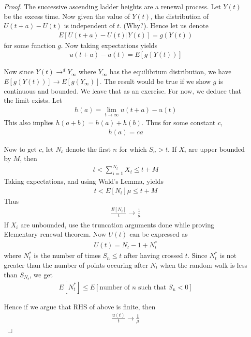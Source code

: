 \documentclass[a4paper,10pt,english]{article}
\begin{document}
\begin{proof}
The successive ascending ladder heights are a renewal process. Let $Y(t)$ be the excess time. Now given the value of $Y(t)$, the distribution of $U(t+a) - U(t)$ is independent of $t$. (Why?). Hence let us denote
\begin{align*}E[U(t+a) - U(t)|Y(t)] = g(Y(t))\end{align*}
for some function $g$. Now taking expectations yields
\begin{align*}u(t+a) - u(t) = E[g(Y(t))]\end{align*}

Now since $Y(t) \to^d Y_\infty$ where $Y_\infty$ has the equilibrium distribution, we have $E[g(Y(t))] \to E[g(Y_\infty)]$. The result would be true if we show $g$ is continuous and bounded. We leave that as an exercise. For now, we deduce that the limit exists. Let
\begin{align*}h(a) = \lim_{t \to \infty}u(t+a) - u(t)\end{align*}
This also implies $h(a+b) = h(a) + h(b)$. Thus for some constant $c$, 
\begin{align*}h(a) = ca\end{align*}

Now to get $c$, let $N_t$ denote the first $n$ for which $S_n > t$. If $X_i$ are upper bounded by $M$, then
\begin{align*}t < \sum_{i=1}^{N_t} X_i \leq t+M\end{align*}
Taking expectations, and using Wald's Lemma, yields
\begin{align*}t < E[N_t]\mu \leq t+M\end{align*}
Thus 
\begin{align*}\frac{E[N_t]}{t} \to \frac{1}{\mu}\end{align*}
If $X_i$ are unbounded, use the truncation arguments done while proving Elementary renewal theorem. Now $U(t)$ can be expressed as
\begin{align*}U(t) = N_t -1 +N_t^*\end{align*}
where $N_t^*$ is the number of times $S_n \leq t$ after having crossed $t$. Since $N_t^*$ is not greater than the number of points occuring after $N_t$ when the random walk is less than $S_{N_t}$, we get
\begin{align*}E[N_t^*] \leq E[\mbox{number of $n$ such that $S_n < 0$}]\end{align*}

Hence if we argue that RHS of above is finite, then
\begin{align*}\frac{u(t)}{t} \to \frac{1}{\mu}\end{align*}


\end{proof}
\end{document}
